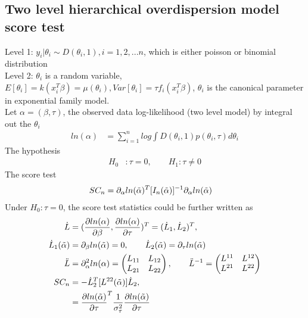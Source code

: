 \documentclass[11pt]{article} %
\begin{document}
\subsection{Two level hierarchical overdispersion model score test}

Level 1: $y_i|\theta_i \sim D(\theta_i, 1), i=1,2,... n $, which is either poisson or binomial distribution\\
Level 2: $\theta_i$ is a random variable, $E[\theta_i] = k(x_i^T \beta)= \mu(\theta_i), Var[\theta_i] = \tau f_i(x_i^T \beta)$, $\theta_i$ is the canonical parameter in exponential family model.\\
Let $\alpha = (\beta, \tau)$, the observed data log-likelihood (two level model) by integral out the $\theta_i$
\begin{align*}
	ln(\alpha) &= \sum_{i=1}^n log \int D(\theta_i,1) p(\theta_i, \tau) d\theta_i
\end{align*} 
The hypothesis
\begin{align*}
	H_0 &: \tau = 0, \qquad H_1 : \tau \neq 0
\end{align*} 
The score test
\begin{align*}
	SC_n &=  \partial_{\alpha} ln(\Tilde{\alpha})^T [I_n(\Tilde{\alpha})]^{-1} \partial_{\alpha} ln(\Tilde{\alpha})
\end{align*} 
Under $H_0: \tau = 0$, the score test statistics could be further written as
\begin{align*}
	\dot{L} &= (\frac{\partial ln(\alpha)}{\partial {\beta}}, \frac{\partial ln(\alpha)}{\partial {\tau}}  )^T =(\dot{L}_1 , \dot{L}_2)^T,\\
	\dot{L}_1(\Tilde{\alpha}) &= \partial_{\beta} ln(\Tilde{\alpha}) = 0, \qquad \dot{L}_2 (\Tilde{\alpha})= \partial_{\tau} ln(\Tilde{\alpha})\\
	\ddot{L} &=\partial^2_{\alpha} ln(\alpha) = \begin{pmatrix}
		L_{11} & L_{12}  \\
		L_{21} & L_{22}  \\
	\end{pmatrix}, \qquad \ddot{L}^{-1} = \begin{pmatrix}
		L^{11} & L^{12}  \\
		L^{21} & L^{22}  \\
	\end{pmatrix}\\
	SC_n &= - \dot{L}_2^T [L^{22}(\Tilde{\alpha})] \dot{L}_2, \\
	&= \frac{\partial ln(\Tilde{\alpha})}{\partial \tau}^T \frac{1}{\sigma_{\tau}^2} \frac{\partial ln(\Tilde{\alpha})}{\partial \tau}
\end{align*}
\end{document}

